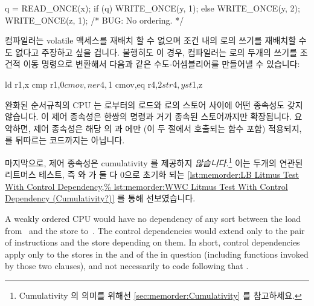 \fi

\begin{VerbatimN}
q = READ_ONCE(x);
if (q)
	WRITE_ONCE(y, 1);
else
	WRITE_ONCE(y, 2);
WRITE_ONCE(z, 1);  /* BUG: No ordering. */
\end{VerbatimN}

컴파일러는 volatile 액세스를 재배치 할 수 없으며 조건 내의  로의 쓰기를
재배치할 수도 없다고 주장하고 싶을 겁니다.
불행히도 이 경우, 컴파일러는  로의 두개의 쓰기를 조건적 이동 명령으로
변환해서 다음과 같은 수도-어셈블리어를 만들어낼 수 있습니다:

\begin{VerbatimN}
ld r1,x
cmp r1,$0
cmov,ne r4,$1
cmov,eq r4,$2
st r4,y
st $1,z
\end{VerbatimN}

완화된 순서규칙의 CPU 는  로부터의 로드와  로의 스토어 사이에 어떤
종속성도 갖지 않습니다.
이 제어 종속성은 한쌍의  명령과 거기 종속된 스토어까지만 확장됩니다.
요약하면, 제어 종속성은 해당  의  과  에만 (이 두
절에서 호출되는 함수 포함) 적용되지,  를 뒤따르는 코드까지는 아닙니다.

마지막으로, 제어 종속성은 cumulativity 를 제공하지 \emph{않습니다}.\footnote{
	Cumulativity 의 의미를 위해선
	\cref{sec:memorder:Cumulativity} 를 참고하세요.}
이는 두개의 연관된 리트머스 테스트, 즉  와  가 둘 다 0으로 초기화
되는
\cref{lst:memorder:LB Litmus Test With Control Dependency,%
lst:memorder:WWC Litmus Test With Control Dependency (Cumulativity?)}
를 통해 선보였습니다.

\iffalse

A weakly ordered CPU would have no dependency of any sort between the load
from~ and the store to~.
The control dependencies would extend
only to the pair of  instructions and the store depending on them.
In short, control dependencies apply only to the stores in the 
and  of the  in question (including functions invoked by
those two clauses), and not necessarily to code following that .

